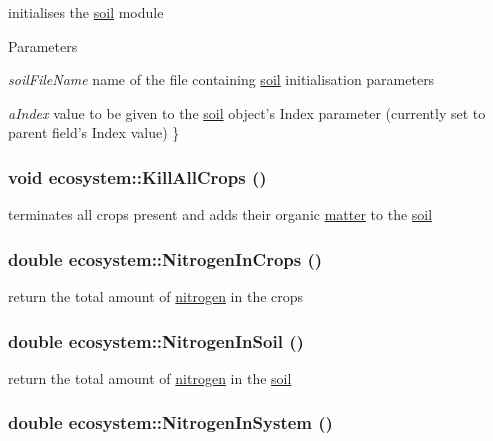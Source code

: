 initialises the \hyperlink{classsoil}{soil} module 
\begin{DoxyParams}{Parameters}
\item[{\em soilFileName}]name of the file containing \hyperlink{classsoil}{soil} initialisation parameters \item[{\em aIndex}]value to be given to the \hyperlink{classsoil}{soil} object's Index parameter (currently set to parent field's Index value) \} \end{DoxyParams}
\hypertarget{classecosystem_ae978ad3f949181bffc509034f73f61f4}{
\subsubsection[{KillAllCrops}]{\setlength{\rightskip}{0pt plus 5cm}void ecosystem::KillAllCrops ()}}
\label{classecosystem_ae978ad3f949181bffc509034f73f61f4}


terminates all crops present and adds their organic \hyperlink{classmatter}{matter} to the \hyperlink{classsoil}{soil} \hypertarget{classecosystem_a37510ceb9f78738a84d1155ffa592f12}{
\subsubsection[{NitrogenInCrops}]{\setlength{\rightskip}{0pt plus 5cm}double ecosystem::NitrogenInCrops ()}}
\label{classecosystem_a37510ceb9f78738a84d1155ffa592f12}


return the total amount of \hyperlink{classnitrogen}{nitrogen} in the crops \hypertarget{classecosystem_a8ffb63ec540734dcba14fd0d74ba7d14}{
\subsubsection[{NitrogenInSoil}]{\setlength{\rightskip}{0pt plus 5cm}double ecosystem::NitrogenInSoil ()}}
\label{classecosystem_a8ffb63ec540734dcba14fd0d74ba7d14}


return the total amount of \hyperlink{classnitrogen}{nitrogen} in the \hyperlink{classsoil}{soil} \hypertarget{classecosystem_acfb7342a6031a4451c885cf8ee9b365e}{
\subsubsection[{NitrogenInSystem}]{\setlength{\rightskip}{0pt plus 5cm}double ecosystem::NitrogenInSystem ()}}
\label{classecosystem_acfb7342a6031a4451c885cf8ee9b365e}


